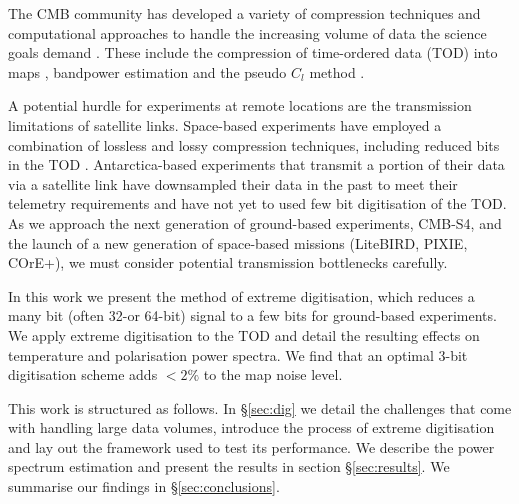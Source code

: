 \documentclass[apj]{emulateapj}
\begin{document}
The CMB community has developed a variety of compression techniques and computational approaches to handle the increasing volume of data the science goals demand \citep{tristam2007}. These include the compression of time-ordered data (TOD) into maps \citep{tegmark1997}, bandpower estimation \citep{tegmark1998} and the pseudo $C_l$ method \citep{brown2005}.

A potential hurdle for experiments at remote locations are the transmission limitations of satellite links. Space-based experiments have employed a combination of lossless and lossy compression techniques, including reduced bits in the TOD \citep{gaztanaga1998, maris2003}. Antarctica-based experiments that transmit a portion of their data via a satellite link have downsampled their data in the past to meet their telemetry requirements and have not yet to used few bit digitisation of the TOD. As we approach the next generation of ground-based experiments, CMB-S4, and the launch of a new generation of space-based missions (LiteBIRD, PIXIE, COrE+), we must consider potential transmission bottlenecks carefully. %

In this work we present the method of extreme digitisation, which reduces a many bit (often 32-or 64-bit) signal to a few bits for ground-based experiments. We apply extreme digitisation to the TOD and detail the resulting effects on temperature and polarisation power spectra. We find that an optimal 3-bit digitisation scheme adds $< 2\%$ to the map noise level.

This work is structured as follows. In \S\ref{sec:dig} we detail the challenges that come with handling large data volumes, introduce the process of extreme digitisation and lay out the framework used to test its performance. We describe the power spectrum estimation and present the results in section \S\ref{sec:results}. We summarise our findings in \S\ref{sec:conclusions}.

\end{document}
